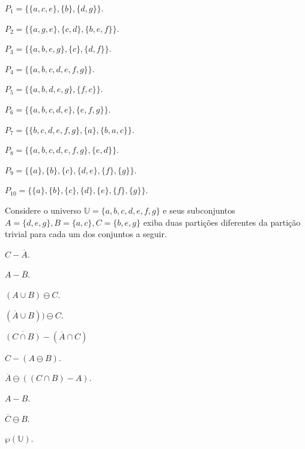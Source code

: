 \begin{exerList}
	\item $P_1 = \{\{a, c, e\}, \{b\}, \{d, g\}\}$.
	\item $P_2 = \{\{a, g, e\}, \{c, d\}, \{b, e, f\}\}$.
	\item $P_3 = \{\{a, b, e, g\}, \{c\}, \{d, f\}\}$.
	\item $P_4 = \{\{a, b, c, d, e, f, g\}\}$.
	\item $P_5 = \{\{a, b, d, e, g\}, \{f, c\}\}$.
	\item $P_6 = \{\{a, b, c, d, e\}, \{e, f, g\}\}$.
	\item $P_7 = \{\{b, c, d, e, f, g\}, \{a\}, \{b, a,c\}\}$.
	\item $P_8 = \{\{a, b, c, d, e, f, g\}, \{e, d\}\}$.
	\item $P_9 = \{\{a\}, \{b\}, \{c\}, \{d,e\}, \{f\}, \{g\}\}$.
	\item $P_{10} = \{\{a\}, \{b\}, \{c\}, \{d\}, \{e\}, \{f\}, \{g\}\}$.
\end{exerList}

\begin{questao}\label{test:Conjuntos17}
	Considere o universo $\mathbb{U} = \{a, b, c, d, e, f, g\}$ e seus subconjuntos $A = \{d, e, g\}, B = \{a, c\}, C =\{b, e, g\}$ exiba duas partições diferentes da partição trivial para cada um dos conjuntos a seguir.
\end{questao}

\begin{exerList}
	\item $C - \overline{A}$.
	\item $A - \overline{B}$.
	\item $(A \cup B) \ominus C$.
	\item $(\overline{A} \cup B)) \ominus C$.
	\item $\overline{(C \cap B)} - (\overline{A} \cap C)$
	\item $C - (A \ominus B)$.
	\item $\overline{A} \ominus ((C \cap B)  - A)$.
	\item $A - B$.
	\item $\overline{C} \ominus B$.
	\item $\wp(\mathbb{U})$.
\end{exerList}
